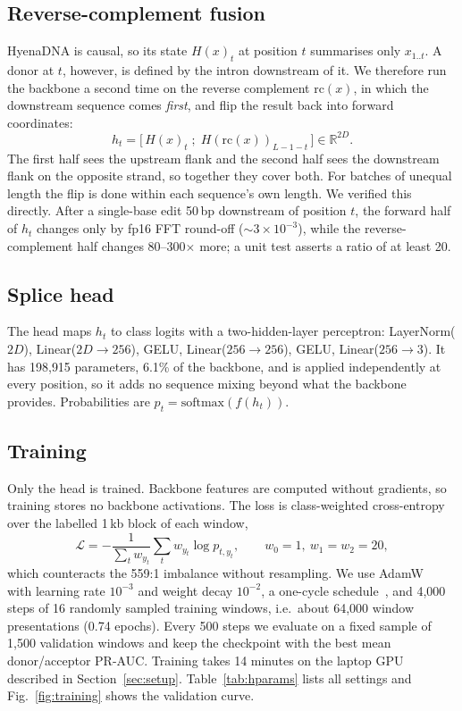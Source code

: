 \documentclass[conference]{IEEEtran}
\begin{document}
\subsection{Reverse-complement fusion}
HyenaDNA is causal, so its state $H(x)_t$ at position $t$ summarises only $x_{1..t}$. A donor at $t$, however, is defined by the intron downstream of it. We therefore run the backbone a second time on the reverse complement $\mathrm{rc}(x)$, in which the downstream sequence comes \emph{first}, and flip the result back into forward coordinates:
\begin{equation}
h_t = \big[\, H(x)_t \;;\; H(\mathrm{rc}(x))_{L-1-t} \,\big] \in \mathbb{R}^{2D}.
\label{eq:rc}
\end{equation}
The first half sees the upstream flank and the second half sees the downstream flank on the opposite strand, so together they cover both. For batches of unequal length the flip is done within each sequence's own length. We verified this directly. After a single-base edit 50\,bp downstream of position $t$, the forward half of $h_t$ changes only by fp16 FFT round-off ($\sim3\times10^{-3}$), while the reverse-complement half changes 80--300$\times$ more; a unit test asserts a ratio of at least 20.

\subsection{Splice head}
The head maps $h_t$ to class logits with a two-hidden-layer perceptron: LayerNorm($2D$), Linear($2D\!\to\!256$), GELU, Linear($256\!\to\!256$), GELU, Linear($256\!\to\!3$). It has 198{,}915 parameters, 6.1\% of the backbone, and is applied independently at every position, so it adds no sequence mixing beyond what the backbone provides. Probabilities are $p_t=\mathrm{softmax}(f(h_t))$.

\subsection{Training}
Only the head is trained. Backbone features are computed without gradients, so training stores no backbone activations. The loss is class-weighted cross-entropy over the labelled 1\,kb block of each window,
\begin{equation}
\mathcal{L}=-\frac{1}{\sum_t w_{y_t}}\sum_{t} w_{y_t}\log p_{t,y_t},\qquad w_0=1,\ w_1=w_2=20,
\end{equation}
which counteracts the 559:1 imbalance without resampling. We use AdamW~\cite{loshchilov2019adamw} with learning rate $10^{-3}$ and weight decay $10^{-2}$, a one-cycle schedule~\cite{smith2019superconvergence}, and 4{,}000 steps of 16 randomly sampled training windows, i.e.\ about 64{,}000 window presentations (0.74 epochs). Every 500 steps we evaluate on a fixed sample of 1{,}500 validation windows and keep the checkpoint with the best mean donor/acceptor PR-AUC. Training takes 14 minutes on the laptop GPU described in Section~\ref{sec:setup}. Table~\ref{tab:hparams} lists all settings and Fig.~\ref{fig:training} shows the validation curve.
\end{document}

